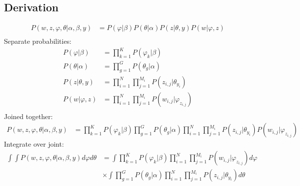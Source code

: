 \documentclass{article} %
\begin{document}
\subsection{Derivation}\label{ref:derivation}
\begin{mdframed}
\begin{align}
P(w, z, \varphi, \theta | \alpha, \beta, y) &= P(\varphi | \beta)P(\theta | \alpha)P(z | \theta, y)P(w | \varphi, z)\\
\end{align}
Separate probabilities:
\begin{align}
P(\varphi | \beta) &= \prod\limits_{k=1}^K P(\varphi_k|\beta)\\
P(\theta | \alpha) &= \prod\limits_{g=1}^G P(\theta_g|\alpha)\\
P(z | \theta, y) &= \prod\limits_{i=1}^N \prod\limits_{j=1}^{M_i} P(z_{i,j}|\theta_{y_i})\\
P(w | \varphi, z) &= \prod\limits_{i=1}^N \prod\limits_{j=1}^{M_i} P(w_{i,j}|\varphi_{z_{i,j}})\\
\end{align}
Joined together:
\begin{align}
P(w, z, \varphi, \theta | \alpha, \beta, y) &= \prod\limits_{k=1}^K P(\varphi_k|\beta) \prod\limits_{g=1}^G P(\theta_g|\alpha) \prod^N_{i=1}\prod^{M_i}_{j=1} P(z_{i,j}|\theta_{y_i}) P(w_{i,j}|\varphi_{z_{i,j}})
\end{align}
Integrate over joint:
\begin{align}
\int \int P(w, z, \varphi, \theta | \alpha, \beta, y) d\varphi d\theta &= \int \prod\limits_{k=1}^K P(\varphi_k|\beta) \prod^N_{i=1}\prod^{M_i}_{j=1} P(w_{i,j}|\varphi_{z_{i,j}}) d\varphi\\
&\times \int \prod\limits_{g=1}^G P(\theta_g|\alpha) \prod^N_{i=1}\prod^{M_i}_{j=1} P(z_{i,j}|\theta_{y_i}) d\theta
\end{align}

\end{mdframed}
\end{document}
